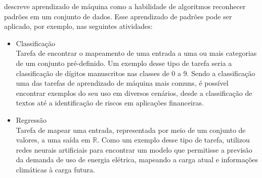 \documentclass[
    12pt,
    oneside,
    a4paper,
    english,
    brazil
]{abntex2}
\begin{document}
 descreve aprendizado de máquina como a habilidade  de algoritmos reconhecer padrões em um conjunto de dados. 
Esse aprendizado de padrões pode ser aplicado, por exemplo, nas seguintes atividades:
\begin{itemize}
    \item Classificação\\
        Tarefa de encontrar  o  mapeamento  de  uma   entrada  a  uma  ou mais categorias de um conjunto pré-definido.
        Um exemplo desse tipo de tarefa seria a classificação de dígitos manuscritos nas classes de 0 a 9. Sendo a classificação uma das tarefas de aprendizado de máquina mais comuns, é possível encontrar  exemplos do seu uso em diversos cenários, desde a classificação de textos até a identificação de riscos em aplicações financeiras.
    \item Regressão\\
        Tarefa de mapear uma entrada, representada por meio de um conjunto  de valores, a uma saída em  $\mathbb{R}$. 
        Como um exemplo desse tipo de tarefa,  utilizou redes  neurais   artificiais para encontrar um modelo que permitisse a previsão da  demanda de  uso de energia elétrica,  mapeando a carga atual e informações climáticas à carga futura.
\end{itemize}
\end{document}
